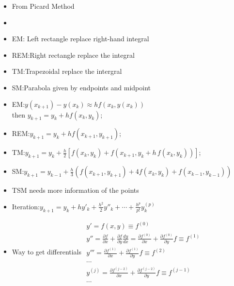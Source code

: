 \documentclass[english]{beamer}
\def\lyxframeend{} %
\begin{document}
\lyxframeend{}
\begin{itemize}
\item <1->From Picard Method
\item <1->%
\item <2-2>EM: Left rectangle replace right-hand integral
\item <3-3>REM:Right rectangle replace the integral
\item <4-4>TM:Trapezoidal replace the intergral
\item <5-5>SM:Parabola given by endpoints and midpoint
\end{itemize}

\lyxframeend{}
\begin{itemize}
\item <1-1>EM:$y({x_{k+1}})-y({x_{k}})\approx hf({x_{k}},y({x_{k}}))$\\
then ${y_{k+1}}={y_{k}}+hf({x_{k}},{y_{k}})$;
\item <2-2>REM:${y_{k+1}}={y_{k}}+hf({x_{k+1}},{y_{k+1}})$;
\item <3-3>TM:${y_{k+1}}={y_{k}}+\frac{h}{2}\left[{f({x_{k}},{y_{k}})+f\left({{x_{k+1}},{y_{k}}+h\, f({x_{k}},{y_{k}})}\right)}\right]$;
\item <4-4>SM:$y_{k+1}=y_{k-1}+\frac{h}{3}(f(x_{k+1},y_{k+1})+4f(x_{k},y_{k})+f(x_{k-1},y_{k-1}))$
\end{itemize}

\lyxframeend{}
\begin{itemize}
\item <1->TSM needs more information of the points 
\item <2->Iteration:${y_{k+1}}={y_{k}}+h{y'_{k}}+\frac{{h^{2}}}{2}{y''_{k}}+\cdots+\frac{{h^{p}}}{{p!}}y_{k}^{(p)}$
\item <3->Way to get differentials $\begin{array}{l}
y'=f(x,y)\equiv{f^{(0)}}\\
y''=\frac{{\partial f}}{{\partial x}}+\frac{{\partial f}}{{\partial y}}\frac{{dy}}{{dx}}=\frac{{\partial{f^{(0)}}}}{{\partial x}}+\frac{{\partial{f^{(0)}}}}{{\partial y}}f\equiv{f^{(1)}}\\
y'''=\frac{{\partial{f^{(1)}}}}{{\partial x}}+\frac{{\partial{f^{(1)}}}}{{\partial y}}f\equiv{f^{(2)}}\\
\cdots\\
{y^{(j)}}=\frac{{\partial{f^{(j-2)}}}}{{\partial x}}+\frac{{\partial{f^{(j-2)}}}}{{\partial y}}f\equiv{f^{(j-1)}}\\
\cdots
\end{array}$
\end{itemize}
\end{document}
